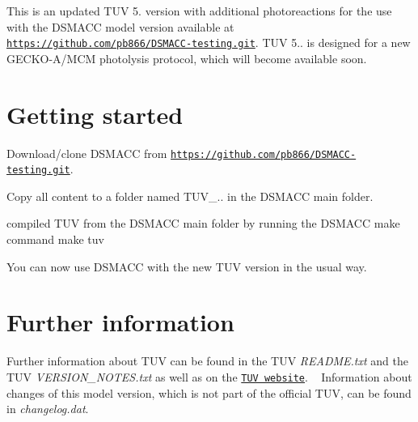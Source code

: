 This is an updated T\+UV 5. version with additional photoreactions for the use with the D\+S\+M\+A\+CC model version available at \href{https://github.com/pb866/DSMACC-testing.git}{\tt https\+://github.\+com/pb866/\+D\+S\+M\+A\+C\+C-\/testing.\+git}. T\+UV 5.. is designed for a new G\+E\+C\+K\+O-\/\+A/\+M\+CM photolysis protocol, which will become available soon.

\section*{Getting started }


\begin{DoxyItemize}
\item Download/clone D\+S\+M\+A\+CC from {\ttfamily \href{https://github.com/pb866/DSMACC-testing.git}{\tt https\+://github.\+com/pb866/\+D\+S\+M\+A\+C\+C-\/testing.\+git}}.
\item Copy all content to a folder named {\ttfamily T\+U\+V\+\_..} in the D\+S\+M\+A\+CC main folder.
\item compiled T\+UV from the D\+S\+M\+A\+CC main folder by running the D\+S\+M\+A\+CC make command {\ttfamily make tuv}
\item You can now use D\+S\+M\+A\+CC with the new T\+UV version in the usual way.
\end{DoxyItemize}

\section*{Further information }

Further information about T\+UV can be found in the T\+UV {\itshape R\+E\+A\+D\+M\+E.\+txt} and the T\+UV {\itshape V\+E\+R\+S\+I\+O\+N\+\_\+\+N\+O\+T\+E\+S.\+txt} as well as on the \href{https://www2.acom.ucar.edu/modeling/tropospheric-ultraviolet-and-visible-tuv-radiation-model}{\tt T\+UV website}. ~\newline
Information about changes of this model version, which is not part of the official T\+UV, can be found in {\itshape changelog.\+dat}. 
